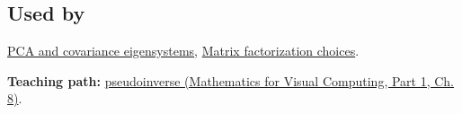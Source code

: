 \subsection{Used by}\label{appendix-541306fdbc1b-used-by}

\hypertarget{appendix-541306fdbc1b-used-by}{}

\hyperref[appendix-ad175ef3c5bf]{PCA and covariance eigensystems}, \hyperref[appendix-221a483bec2d]{Matrix factorization choices}.

\textbf{Teaching path:} \href{../02-Mathematics-for-Visual-Computing-P01/main.pdf\#nameddest=02-foundations-ii-ch024-pseudoinverse-makes-least-squares-and-minimum-norm-one-operation}{pseudoinverse (Mathematics for Visual Computing, Part 1, Ch. 8)}.
